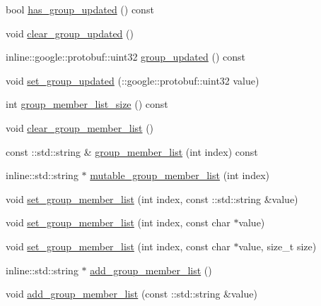 \begin{DoxyCompactItemize}
\item 
bool \hyperlink{class_i_m_1_1_base_define_1_1_client_group_info_a10b426b93ddd85e44b493507082dfa86}{has\+\_\+group\+\_\+updated} () const 
\item 
void \hyperlink{class_i_m_1_1_base_define_1_1_client_group_info_aded69ddb2aa2fac5145d05879f9b7a4e}{clear\+\_\+group\+\_\+updated} ()
\item 
inline\+::google\+::protobuf\+::uint32 \hyperlink{class_i_m_1_1_base_define_1_1_client_group_info_aad012c8c9295de6cd4c6c638ff8bf1ee}{group\+\_\+updated} () const 
\item 
void \hyperlink{class_i_m_1_1_base_define_1_1_client_group_info_aacea112aa6e82af6f9dd35bf3731b8e1}{set\+\_\+group\+\_\+updated} (\+::google\+::protobuf\+::uint32 value)
\item 
int \hyperlink{class_i_m_1_1_base_define_1_1_client_group_info_a1aca1e102bcef7fe3055456e1c9cd264}{group\+\_\+member\+\_\+list\+\_\+size} () const 
\item 
void \hyperlink{class_i_m_1_1_base_define_1_1_client_group_info_ac7a4d7d89ab6b233e22143da8096c8b0}{clear\+\_\+group\+\_\+member\+\_\+list} ()
\item 
const \+::std\+::string \& \hyperlink{class_i_m_1_1_base_define_1_1_client_group_info_af3043163858ae711de9afdca17b04e78}{group\+\_\+member\+\_\+list} (int index) const 
\item 
inline\+::std\+::string $\ast$ \hyperlink{class_i_m_1_1_base_define_1_1_client_group_info_a8216847c4e979b0cd3519ad7bddb3068}{mutable\+\_\+group\+\_\+member\+\_\+list} (int index)
\item 
void \hyperlink{class_i_m_1_1_base_define_1_1_client_group_info_a349a8bc9eb9b393883e8248ff491e72d}{set\+\_\+group\+\_\+member\+\_\+list} (int index, const \+::std\+::string \&value)
\item 
void \hyperlink{class_i_m_1_1_base_define_1_1_client_group_info_a3f9a5305ff15c429d9f5aad766248ced}{set\+\_\+group\+\_\+member\+\_\+list} (int index, const char $\ast$value)
\item 
void \hyperlink{class_i_m_1_1_base_define_1_1_client_group_info_ae6372be06a6231e71d96a717a2a7d712}{set\+\_\+group\+\_\+member\+\_\+list} (int index, const char $\ast$value, size\+\_\+t size)
\item 
inline\+::std\+::string $\ast$ \hyperlink{class_i_m_1_1_base_define_1_1_client_group_info_afe2189cf05a98f82163bce4e4e8b013b}{add\+\_\+group\+\_\+member\+\_\+list} ()
\item 
void \hyperlink{class_i_m_1_1_base_define_1_1_client_group_info_a03b0fa3de37a9a3a140b7593d65e28e0}{add\+\_\+group\+\_\+member\+\_\+list} (const \+::std\+::string \&value)

\end{DoxyCompactItemize}
